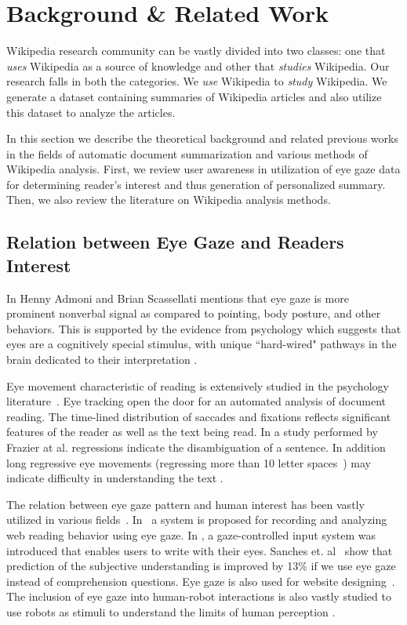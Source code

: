 \documentclass[12pt]{article}
\begin{document}
\section{Background \& Related Work}\label{sec:Related}
Wikipedia research community can be vastly divided into two classes: one that \emph{uses} Wikipedia as a source of knowledge and other that \emph{studies} Wikipedia. Our research falls in both the categories. We \emph{use} Wikipedia to \emph{study} Wikipedia. We generate a dataset containing summaries of Wikipedia articles and also utilize this dataset to analyze the articles.

In this section we describe the theoretical background and related previous works in the fields of automatic document summarization and various methods of Wikipedia analysis. First, we review user awareness in utilization of eye gaze data for determining reader's interest and thus generation of personalized summary. Then, we also review the literature on Wikipedia analysis methods.

\subsection{Relation between Eye Gaze and Readers Interest}
In \cite{admoni2017social} Henny Admoni and Brian Scassellati mentions that eye gaze is more prominent nonverbal signal as compared to pointing, body posture, and other behaviors. This is supported by the evidence from psychology which suggests that eyes are a cognitively special stimulus, with unique ``hard-wired" pathways in the brain dedicated to their interpretation \cite{emery2000eyes}.

Eye movement characteristic of reading is extensively studied in the psychology literature~\cite{rayner1998eye}. Eye tracking open the door for an automated analysis of document reading. The time-lined distribution of saccades and fixations reflects significant features of the reader as well as the text being read. In a study performed by Frazier at al. \cite{frazier1982making} regressions indicate the disambiguation of a sentence. In addition long regressive eye movements (regressing more than 10 letter spaces~\cite{rayner1998eye}) may indicate difficulty in understanding the text \cite{frazier1982making} \cite{rayner2012eye}. 

The relation between eye gaze pattern and human interest has been vastly utilized in various fields~\cite{knight2013estimating}. In~\cite{beymer2005webgazeanalyzer} a system is proposed for recording and analyzing web reading behavior using eye gaze. In \cite{bee2008writing}, a gaze-controlled input system was introduced that enables users to write with their eyes. Sanches et. al~\cite{sanches2018estimation} show that prediction of the subjective understanding is improved by 13\% if we use eye gaze instead of comprehension questions. Eye gaze is also used for website designing~\cite{djamasbi2014eye}. The inclusion of eye gaze into human-robot interactions is also vastly studied to use robots as stimuli to understand the limits of human perception \cite{admoni2017social}.
\end{document}
